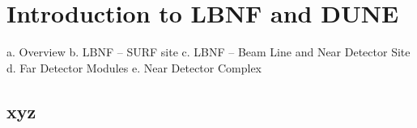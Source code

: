 \chapter{Introduction to LBNF and DUNE}
\label{ch:physics-intro}


a.	Overview
b.	LBNF – SURF site
c.	LBNF – Beam Line and Near Detector Site
d.	Far Detector Modules
e.	Near Detector Complex


\section{xyz}
\label{sec:xyz}

